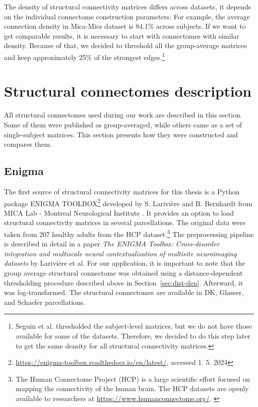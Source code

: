 The density of structural connectivity matrices differs across da\-ta\-sets, it depends on the individual connectome construction parameters. For example, the average connection density in Mica-Mics dataset is  84.1\% across subjects. \cite{seguin_communication_2023} If we want to get comparable results, it is necessary to start with connectomes with similar density. Because of that, we decided to threshold all the group-average matrices and keep approximately 25\% of the strongest edges.\footnote{Seguin et al. thresholded the subject-level matrices, but we do not have those available for some of the datasets. Therefore, we decided to do this step later to get the same density for all structural connectivity matrices.}

\section{Structural connectomes description}

All structural connectomes used during our work are described in this section. Some of them were published as group-averaged, while others came as a set of single-subject matrices. This section presents how they were constructed and compares them. 

\subsection{Enigma}\label{sec:enigma}

The first source of structural connectivity matrices for this thesis is a Python package ENIGMA TOOLBOX\footnote{\url{https://enigma-toolbox.readthedocs.io/en/latest/}, accessed 1. 5. 2024} developed by S. Larivière and B. Bernhardt from MICA Lab - Montreal Neurological Institute \cite{lariviere_enigma_2020}. It provides an option to load structural connectivity matrices in several parcellations. The original data were taken from 207 healthy adults from the HCP dataset.\footnote{The Human Connectome Project (HCP) is a large scientific effort focused on mapping the connectivity of the human brain. The HCP datasets are openly available to researchers at \url{https://www.humanconnectome.org/}. \cite{van_essen_human_2012}} The preprocessing pipeline is described in detail in a paper \textit{The ENIGMA Toolbox: Cross-disorder integration and multiscale neural contextualization of multisite neuroimaging datasets} by Larivière et al. For our application, it is important to note that the group average structural connectome was obtained using a distance-dependent thresholding procedure described above in Section~\ref{sec:dist-dep}. Afterward, it was log-transformed. The structural connectomes are available in DK, Glasser, and Schaefer parcellations. 

